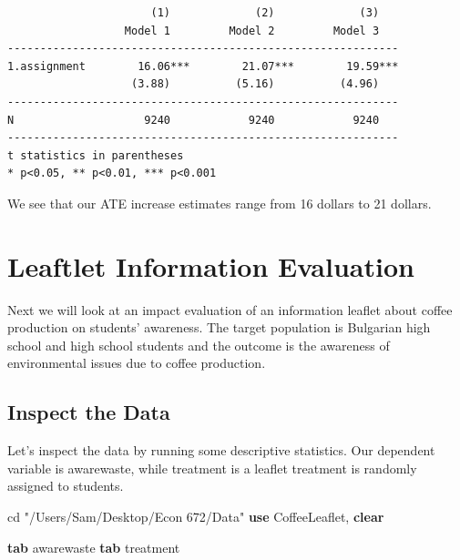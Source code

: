 \documentclass[
]{book}
\newenvironment{Shaded}{\begin{snugshade}}{\end{snugshade}}
\newcommand{\KeywordTok}[1]{\textcolor[rgb]{0.13,0.29,0.53}{\textbf{#1}}}
\newcommand{\NormalTok}[1]{#1}
\newcommand{\StringTok}[1]{\textcolor[rgb]{0.31,0.60,0.02}{#1}}
\begin{document}
\begin{verbatim}
                      (1)             (2)             (3)   
                  Model 1         Model 2         Model 3   
------------------------------------------------------------
1.assignment        16.06***        21.07***        19.59***
                   (3.88)          (5.16)          (4.96)   
------------------------------------------------------------
N                    9240            9240            9240   
------------------------------------------------------------
t statistics in parentheses
* p<0.05, ** p<0.01, *** p<0.001
\end{verbatim}

We see that our ATE increase estimates range from 16 dollars to 21 dollars.

\section{Leaftlet Information Evaluation}\label{leaftlet-information-evaluation}

Next we will look at an impact evaluation of an information leaflet about coffee production on students' awareness. The target population is Bulgarian high school and high school students and the outcome is the awareness of environmental issues due to coffee production.

\subsection{Inspect the Data}\label{inspect-the-data-1}

Let's inspect the data by running some descriptive statistics. Our dependent variable is awarewaste, while treatment is a leaflet treatment is randomly assigned to students.

\begin{Shaded}
\begin{Highlighting}[]
\NormalTok{cd }\StringTok{"/Users/Sam/Desktop/Econ 672/Data"}
\KeywordTok{use}\NormalTok{ CoffeeLeaflet, }\KeywordTok{clear}

\KeywordTok{tab}\NormalTok{ awarewaste}
\KeywordTok{tab}\NormalTok{ treatment}
\end{Highlighting}
\end{Shaded}
\end{document}
